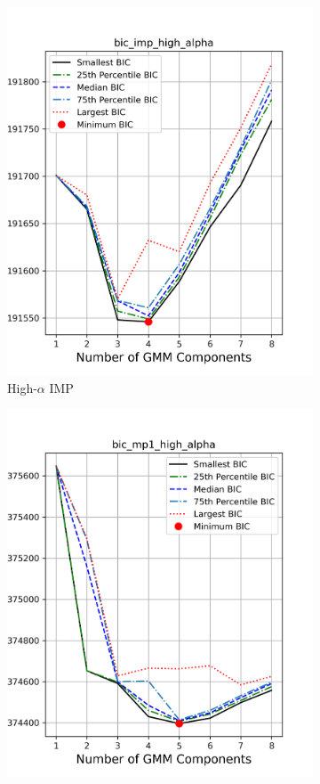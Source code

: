\documentclass[a4paper,12pt]{article}
\begin{document}
\begin{figure}[htbp]
\begin{subfigure}[t]{0.24\textwidth}
        \includegraphics[width=\textwidth]{../figures/bic_imp_high_alpha.png}
        \caption{High-$\alpha$ IMP}
    \end{subfigure}
    \begin{subfigure}[t]{0.24\textwidth}
        \includegraphics[width=\textwidth]{../figures/bic_mp1_high_alpha.png}

\end{subfigure}
\end{figure}
\end{document}
